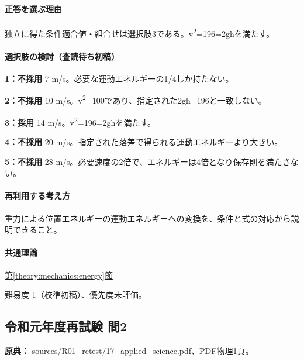 \paragraph{正答を選ぶ理由} 独立に得た条件適合値・組合せは選択肢3である。v\textsuperscript{2}=196=\allowbreak{}2ghを満たす。

\paragraph{選択肢の検討（査読待ち初稿）}\mbox{}\par

\noindent\textbf{1：不採用} 7 m/s。必要な運動エネルギーの1/4しか持たない。\par

\noindent\textbf{2：不採用} 10 m/s。v\textsuperscript{2}=100であり、指定された2gh=\allowbreak{}196と一致しない。\par

\noindent\textbf{3：採用} 14 m/s。v\textsuperscript{2}=196=\allowbreak{}2ghを満たす。\par

\noindent\textbf{4：不採用} 20 m/s。指定された落差で得られる運動エネルギーより大きい。\par

\noindent\textbf{5：不採用} 28 m/s。必要速度の2倍で、エネルギーは4倍となり保存則を満たさない。\par

\paragraph{再利用する考え方} 重力による位置エネルギーの運動エネルギーへの変換を、条件と式の対応から説明できること。

\paragraph{共通理論} \hyperref[theory:mechanics:energy]{第\ref*{theory:mechanics:energy}節}

\par 難易度 1（校準初稿）、優先度未評価。

\subsection{令和元年度再試験 問2}
\label{q:r01-ret-applied-02}

\noindent\textbf{原典：} sources/R01\_retest/17\_applied\_science.pdf、PDF物理1頁。

